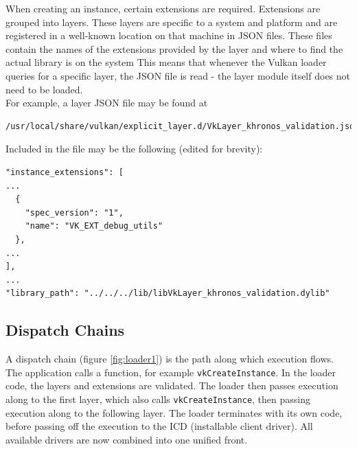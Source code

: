 \documentclass[12pt]{report}
\theoremstyle{definition}
\begin{document}
      When creating an instance, certain extensions are required. Extensions
      are grouped into layers. These layers are specific to a system and
      platform and are registered in a well-known location on that machine
      in JSON files. These files contain the names of the extensions provided
      by the layer and where to find the actual library is on the system This
      means that whenever the Vulkan loader queries for a specific layer, the
      JSON file is read - the layer module itself does not need to be loaded. \\

      For example, a layer JSON file may be found at \\

      \begin{centering}
        \begin{Verbatim}[fontsize=\small]
/usr/local/share/vulkan/explicit_layer.d/VkLayer_khronos_validation.json
        \end{Verbatim}
      \end{centering}

      Included in the file may be the following (edited for brevity):

      \begin{centering}
        \begin{Verbatim}[fontsize=\small]
"instance_extensions": [
...
  {   
    "spec_version": "1", 
    "name": "VK_EXT_debug_utils"
  },
...
],
...
"library_path": "../../../lib/libVkLayer_khronos_validation.dylib"
        \end{Verbatim}
      \end{centering}


      \subsection{Dispatch Chains}

      A dispatch chain (figure \ref{fig:loader1}) is the path along which execution flows. The application
      calls a function, for example \verb|vkCreateInstance|. In the loader code, the
      layers and extensions are validated. The loader then passes execution
      along to the first layer, which also calls \verb|vkCreateInstance|, then
      passing execution along to the following layer. The loader terminates
      with its own code, before passing off the execution to the ICD
      (installable client driver). All available drivers are now combined
      into one unified front.
\end{document}
